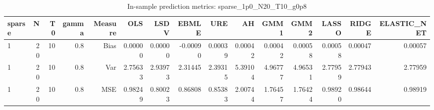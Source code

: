 \begin{table}[!htbp]\centering
\caption{In-sample prediction metrics: sparse_1p0_N20_T10_g0p8}
\label{tab:table2_sparse_1p0_N20_T10_g0p8}
\begin{tabular}{lrrrrrrrrrrrrrr}
\hline
sparse & N & T0 & gamma & Measure & OLS & LSDV & EBMLE & URE & AH & GMM1 & GMM2 & LASSO & RIDGE & ELASTIC_NET \\
\hline
1 & 20 & 10 & 0.8 & Bias & 0.00000 & 0.00000 & -0.00090 & 0.00039 & 0.00042 & 0.00042 & 0.00058 & 0.00058 & 0.00047 & 0.00057 \\
1 & 20 & 10 & 0.8 & Var & 2.75633 & 2.93973 & 2.31445 & 2.39315 & 5.39104 & 4.96777 & 4.96531 & 2.77959 & 2.77943 & 2.77959 \\
1 & 20 & 10 & 0.8 & MSE & 0.98249 & 0.80023 & 0.86808 & 0.85383 & 2.00744 & 1.76457 & 1.76424 & 0.98920 & 0.98644 & 0.98919 \\
\hline
\end{tabular}
\end{table}

